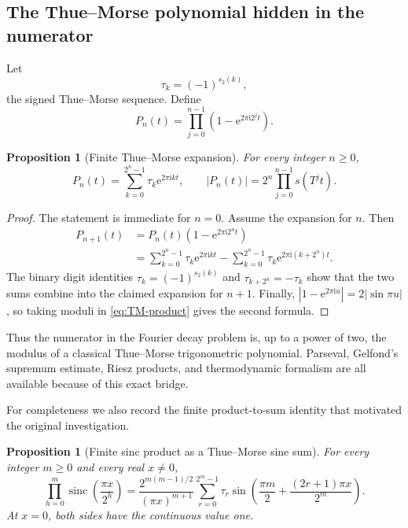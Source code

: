 \documentclass[11pt,oneside]{article}
\numberwithin{equation}{section}
\newtheorem{proposition}[theorem]{Proposition}
\theoremstyle{definition}
\theoremstyle{remark}
\newcommand{\e}{\mathrm e}
\newcommand{\ii}{\mathrm i}
\newcommand{\abs}[1]{\left|#1\right|}
\newcommand{\sinc}{\operatorname{sinc}}
\newcommand{\TM}{\tau}
\newcommand{\digitsum}{s_2}
\begin{document}
\subsection{The Thue--Morse polynomial hidden in the numerator}

Let
\[
 \TM_k=(-1)^{\digitsum(k)},
\]
the signed Thue--Morse sequence.  Define
\begin{equation}
 P_n(t)=\prod_{j=0}^{n-1}\left(1-\e^{2\pi\ii2^jt}\right).
 \label{eq:TM-product}
\end{equation}

\begin{proposition}[Finite Thue--Morse expansion]
\label{prop:TM-polynomial}
For every integer \(n\ge0\),
\begin{equation}
 P_n(t)=\sum_{k=0}^{2^n-1}\TM_k\e^{2\pi\ii kt},
 \qquad
 \abs{P_n(t)}=2^n\prod_{j=0}^{n-1}s(T^jt).
 \label{eq:TM-expansion}
\end{equation}
\end{proposition}

\begin{proof}
The statement is immediate for \(n=0\).  Assume the expansion for \(n\).  Then
\begin{align*}
 P_{n+1}(t)
 &=P_n(t)\left(1-\e^{2\pi\ii2^nt}\right)\\
 &=\sum_{k=0}^{2^n-1}\TM_k\e^{2\pi\ii kt}
   -\sum_{k=0}^{2^n-1}\TM_k\e^{2\pi\ii(k+2^n)t}.
\end{align*}
The binary digit identities
\(\TM_k=(-1)^{\digitsum(k)}\) and
\(\TM_{k+2^n}=-\TM_k\) show that the two sums combine into the claimed expansion for
\(n+1\).  Finally,
\(
 |1-\e^{2\pi\ii u}|=2|\sin\pi u|
\), so taking moduli in \eqref{eq:TM-product} gives the second formula.
\end{proof}

Thus the numerator in the Fourier decay problem is, up to a power of two, the modulus of a
classical Thue--Morse trigonometric polynomial.  Parseval, Gelfond's supremum estimate, Riesz
products, and thermodynamic formalism are all available because of this exact bridge.

For completeness we also record the finite product-to-sum identity that motivated the
original investigation.

\begin{proposition}[Finite sinc product as a Thue--Morse sine sum]
\label{prop:finite-sinc-sum}
For every integer \(m\ge0\) and every real \(x\ne0\),
\begin{equation}
 \prod_{h=0}^{m}\sinc\!\left(\frac{\pi x}{2^h}\right)
 =\frac{2^{m(m-1)/2}}{(\pi x)^{m+1}}
 \sum_{r=0}^{2^m-1}\TM_r
 \sin\!\left(\frac{\pi m}{2}+\frac{(2r+1)\pi x}{2^m}\right).
 \label{eq:finite-sinc-sum}
\end{equation}
At \(x=0\), both sides have the continuous value one.
\end{proposition}
\end{document}
